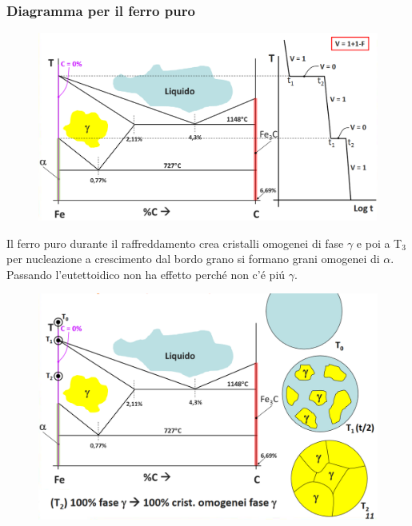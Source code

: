 \documentclass{article}
\begin{document}
{            \subsubsection{Diagramma per il ferro puro}
                \begin{figure}[h!]
                    \centering
                    \includegraphics[width=.85\linewidth]{L12 - Diagramma Fe-C diagramma e traiettoria per ferro puro.png}
                \end{figure}
                Il ferro puro durante il raffreddamento crea cristalli omogenei di fase $\gamma$ e poi a T$_3$ per nucleazione a crescimento dal bordo grano si formano grani omogenei di $\alpha$. Passando l'eutettoidico non ha effetto perch\'e non c'\'e pi\'u $\gamma$.
                \begin{figure}[h!]
                    \centering
                    \includegraphics[width=.85\linewidth]{L12 - Diagramma Fe-C - Ferro Puro - Cambio di Struttura.png}
                \end{figure}
                \begin{figure}[h!]
                    \centering

\end{figure}}
\end{document}
